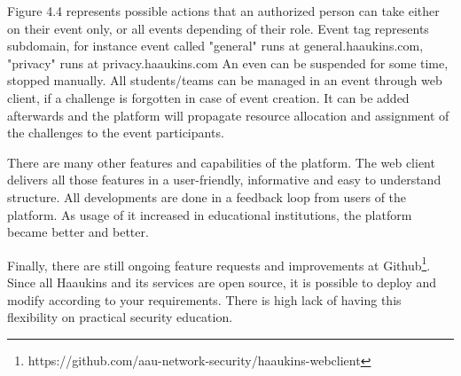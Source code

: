 Figure 4.4 represents possible actions that an authorized person can take either on their event only, or all events depending of their role. Event tag represents subdomain, for instance event called "general" runs at general.haaukins.com, "privacy" runs at privacy.haaukins.com 
An even can be suspended for some time, stopped manually. All students/teams can be managed in an event through web client, if a challenge is forgotten in case of event creation. It can be added afterwards and the platform will propagate resource allocation and assignment of the challenges to the event participants. 

There are many other features and capabilities of the platform. The web client delivers all those features in a user-friendly, informative and easy to understand structure. All developments are done in a feedback loop from users of the platform. As usage of it increased in educational institutions, the platform became better and better. 

Finally, there are still ongoing feature requests and improvements at Github\footnote{https://github.com/aau-network-security/haaukins-webclient}. Since all Haaukins and its services are open source, it is possible to deploy and modify according to your requirements. There is high lack of having this flexibility on practical security education. 



